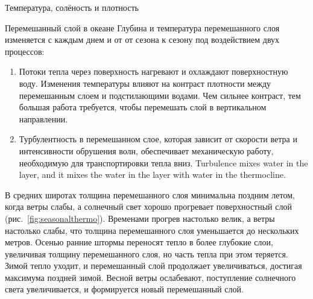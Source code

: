 \begin{chapter}{Температура, солёность и плотность}
\begin{section}{Перемешанный слой в океане}
Глубина и температура перемешанного слоя изменяется с каждым днем и от
от сезона к сезону под воздействием двух процессов:
%
\begin{enumerate}
\item
Потоки тепла через поверхность нагревают и охлаждают поверхностную
воду. Изменения температуры влияют на контраст плотности между
перемешанным слоем и подстилающими водами. Чем сильнее контраст, тем
большая работа требуется, чтобы перемешать слой в вертикальном
направлении.
%

\item
Турбулентность в перемешанном слое, которая зависит от скорости ветра 
и интенсивности обрушения волн, обеспечивает механическую работу,
необходимую для транспортировки тепла вниз. Turbulence mixes water in the
layer, and it mixes the water in the layer with water in the thermocline.
% 
\end{enumerate}

В средних широтах толщина перемешанного слоя минимальна поздним летом, 
когда ветры слабы, а солнечный свет хорошо прогревает поверхностный
слой (рис.~\ref{fig:seasonalthermo}). Временами прогрев настолько велик, 
а ветры настолько слабы, что толщина перемешанного слоя уменьшается 
до нескольких метров. Осенью ранние штормы переносят тепло в более 
глубокие слои, увеличивая толщину перемешанного слоя, но часть тепла 
при этом теряется. Зимой тепло уходит, и перемешанный слой продолжает 
увеличиваться, достигая максимума поздней зимой. Весной ветры ослабевают, 
поступление солнечного света увеличивается, и формируется новый 
перемешанный слой.
%


\end{section}
\end{chapter}
